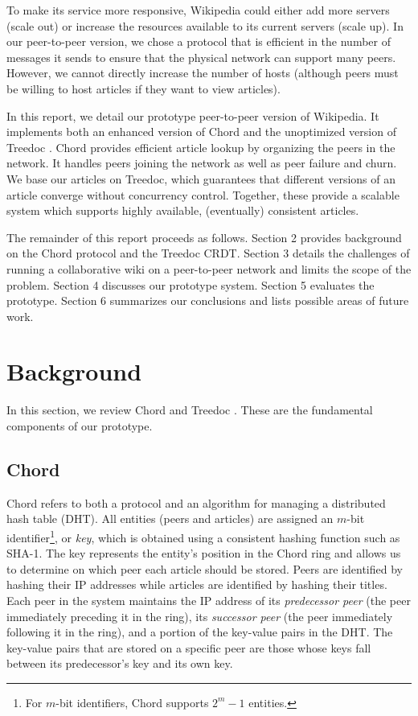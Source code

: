 \documentclass[twocolumn]{article}
\begin{document}
To make its service more responsive, Wikipedia could either add more servers (scale out) or increase the resources available to its current servers (scale up). In our peer-to-peer version, we chose a protocol that is efficient in the number of messages it sends to ensure that the physical network can support many peers. However, we cannot directly increase the number of hosts (although peers must be willing to host articles if they want to view articles).

In this report, we detail our prototype peer-to-peer version of Wikipedia. It implements both an enhanced version of Chord \cite{c1} and the unoptimized version of Treedoc \cite{t1,t2}. Chord provides efficient article lookup by organizing the peers in the network. It handles peers joining the network as well as peer failure and churn. We base our articles on Treedoc, which guarantees that different versions of an article converge without concurrency control. Together, these provide a scalable system which supports highly available, (eventually) consistent articles.

The remainder of this report proceeds as follows. Section 2 provides background on the Chord protocol and the Treedoc CRDT. Section 3 details the challenges of running a collaborative wiki on a peer-to-peer network and limits the scope of the problem. Section 4 discusses our prototype system. Section 5 evaluates the prototype. Section 6 summarizes our conclusions and lists possible areas of future work.

\section{Background}
In this section, we review Chord \cite{c1} and Treedoc \cite{t1}. These are the fundamental components of our prototype.

\subsection{Chord}
Chord refers to both a protocol and an algorithm for managing a distributed hash table (DHT). All entities (peers and articles) are assigned an $m$-bit identifier\footnote{For $m$-bit identifiers, Chord supports $2^m-1$ entities.}, or \textit{key}, which is obtained using a consistent hashing function such as SHA-1. The key represents the entity's position in the Chord ring and allows us to determine on which peer each article should be stored. Peers are identified by hashing their IP addresses while articles are identified by hashing their titles. Each peer in the system maintains the IP address of its \textit{predecessor peer} (the peer immediately preceding it in the ring), its \textit{successor peer} (the peer immediately following it in the ring), and a portion of the key-value pairs in the DHT. The key-value pairs that are stored on a specific peer are those whose keys fall between its predecessor's key and its own key.
\end{document}
